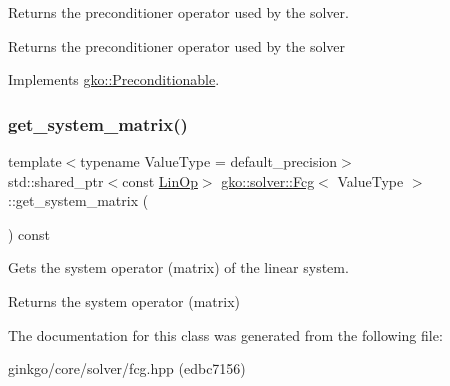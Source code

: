 Returns the preconditioner operator used by the solver. 

\begin{DoxyReturn}{Returns}
the preconditioner operator used by the solver 
\end{DoxyReturn}


Implements \hyperlink{classgko_1_1Preconditionable_ad9545089aef0dfc83bc7a74e5bf1d748}{gko\+::\+Preconditionable}.

\mbox{\label{classgko_1_1solver_1_1Fcg_aae8c67d27df239c18750845275605c87}} 
\subsubsection{\texorpdfstring{get\+\_\+system\+\_\+matrix()}{get\_system\_matrix()}}
{\footnotesize\ttfamily template$<$typename Value\+Type  = default\+\_\+precision$>$ \\
std\+::shared\+\_\+ptr$<$const \hyperlink{classgko_1_1LinOp}{Lin\+Op}$>$ \hyperlink{classgko_1_1solver_1_1Fcg}{gko\+::solver\+::\+Fcg}$<$ Value\+Type $>$\+::get\+\_\+system\+\_\+matrix (\begin{DoxyParamCaption}{ }\end{DoxyParamCaption}) const\hspace{0.3cm}{\ttfamily [inline]}}



Gets the system operator (matrix) of the linear system. 

\begin{DoxyReturn}{Returns}
the system operator (matrix) 
\end{DoxyReturn}


The documentation for this class was generated from the following file\+:\begin{DoxyCompactItemize}
\item 
ginkgo/core/solver/fcg.\+hpp (edbc7156)\end{DoxyCompactItemize}
